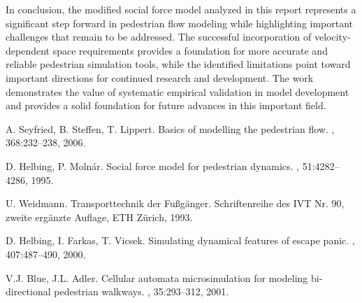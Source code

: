 \documentclass[12pt,a4paper]{article}
\begin{document}
In conclusion, the modified social force model analyzed in this report represents a significant step forward in pedestrian flow modeling while highlighting important challenges that remain to be addressed. The successful incorporation of velocity-dependent space requirements provides a foundation for more accurate and reliable pedestrian simulation tools, while the identified limitations point toward important directions for continued research and development. The work demonstrates the value of systematic empirical validation in model development and provides a solid foundation for future advances in this important field.


\begin{thebibliography}{99}

A. Seyfried, B. Steffen, T. Lippert.
\newblock Basics of modelling the pedestrian flow.
, 368:232--238, 2006.

D. Helbing, P. Molnár.
\newblock Social force model for pedestrian dynamics.
, 51:4282--4286, 1995.

U. Weidmann.
\newblock Transporttechnik der Fußgänger.
\newblock Schriftenreihe des IVT Nr. 90, zweite ergänzte Auflage, ETH Zürich, 1993.

D. Helbing, I. Farkas, T. Vicsek.
\newblock Simulating dynamical features of escape panic.
, 407:487--490, 2000.

V.J. Blue, J.L. Adler.
\newblock Cellular automata microsimulation for modeling bi-directional pedestrian walkways.
, 35:293--312, 2001.

\end{thebibliography}
\end{document}
